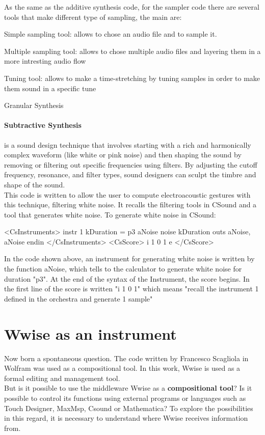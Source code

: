 		As the same as the additive synthesis code, for the sampler code there are several tools that make different type of sampling, the main are:
	
\newpage
	
			\begin{compactitem}
				\item Simple sampling tool: allows to chose an audio file and to sample it.
				\item Multiple sampling tool: allows to chose multiple audio files and layering them in a more intresting audio flow
				\item Tuning tool: allows to make a time-stretching by tuning samples in order to make them sound in a specific tune
				\item Granular Synthesis
			\end{compactitem}
		
		\paragraph{Subtractive Synthesis} is a sound design technique that involves starting with a rich and harmonically complex waveform (like white or pink noise) and then shaping the sound by removing or filtering out specific frequencies using filters. By adjusting the cutoff frequency, resonance, and filter types, sound designers can sculpt the timbre and shape of the sound. \\
		This code is written to allow the user to compute electroacoustic gestures with this technique, filtering white noise. It recalls the filtering tools in CSound and a tool that generates white noise. To generate white noise in CSound:
		
		\begin{code}
			<CsInstruments>
			instr 1
			kDuration = p3
			aNoise    noise kDuration
			outs aNoise, aNoise
			endin
			</CsInstruments>
			<CsScore>
			i 1 0 1
			e
			</CsScore>
		\end{code}
		
		In the code shown above, an instrument for generating white noise is written by the function aNoise, which tells to the calculator to generate white noise for duration "p3". At the end of the syntax of the Instrument, the score begins. In the first line of the score is written "i 1 0 1" which means "recall the instrument 1 defined in the orchestra and generate 1 sample"
		
	\section{Wwise as an instrument}
	Now born a spontaneous question. The code written by Francesco Scagliola in Wolfram was used as a compositional tool. In this work, Wwise is used as a formal editing and management tool. \\
	But is it possible to use the middleware Wwise as a \textbf{compositional tool}? Is it possible to control its functions using external programs or languages ​​such as Touch Designer, MaxMsp, Csound or Mathematica?
	To explore the possibilities in this regard, it is necessary to understand where Wwise receives information from.
	
